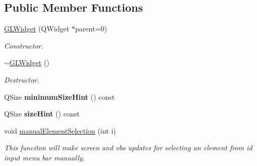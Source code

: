 \subsection*{Public Member Functions}
\begin{DoxyCompactItemize}
\item 
\hypertarget{classGLWidget_ab79c391c86de1ffb76f6950b49d82c0c}{}\hyperlink{classGLWidget_ab79c391c86de1ffb76f6950b49d82c0c}{G\+L\+Widget} (Q\+Widget $\ast$parent=0)\label{classGLWidget_ab79c391c86de1ffb76f6950b49d82c0c}

\begin{DoxyCompactList}\small\item\em Constructor. \end{DoxyCompactList}\item 
\hypertarget{classGLWidget_a535192a4262b4501e5493303834f45d3}{}\hyperlink{classGLWidget_a535192a4262b4501e5493303834f45d3}{$\sim$\+G\+L\+Widget} ()\label{classGLWidget_a535192a4262b4501e5493303834f45d3}

\begin{DoxyCompactList}\small\item\em Destructor. \end{DoxyCompactList}\item 
\hypertarget{classGLWidget_ade3142625c1bfda0576e419b176cf8b1}{}Q\+Size {\bfseries minimum\+Size\+Hint} () const \label{classGLWidget_ade3142625c1bfda0576e419b176cf8b1}

\item 
\hypertarget{classGLWidget_a57698bc426052845b43a135a13540154}{}Q\+Size {\bfseries size\+Hint} () const \label{classGLWidget_a57698bc426052845b43a135a13540154}

\item 
void \hyperlink{classGLWidget_ad425870ac081f6814c5bdb794e6e4c21}{manual\+Element\+Selection} (int i)
\begin{DoxyCompactList}\small\item\em This funciton will make screen and vbo updates for selecting an element from id input menu bar manually. \end{DoxyCompactList}\end{DoxyCompactItemize}
